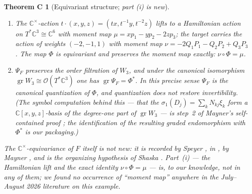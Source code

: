 \documentclass[11pt]{amsart}
\newcommand{\CC}{\mathbb{C}}
\newcommand{\Cstar}{\CC^{\times}}
\newcommand{\W}{W}
\newcommand{\gr}{\operatorname{gr}}
\theoremstyle{plain}
\newtheorem*{thmC}{Theorem C}
\theoremstyle{definition}
\theoremstyle{remark}
\begin{document}
\begin{thmC}[Equivariant structure; \emph{part (i) is new}]
\leavevmode
\begin{enumerate}
\item[(i)] The $\Cstar$-action $t\cdot(x,y,z)=(tx,t^{-1}y,t^{-2}z)$ lifts
to a Hamiltonian action on $T^{*}\CC^{3}\cong\CC^{6}$ with moment map
$\mu=xp_{1}-yp_{2}-2zp_{3}$; the target carries the action of weights
$(-2,-1,1)$ with moment map $\nu=-2Q_{1}P_{1}-Q_{2}P_{2}+Q_{3}P_{3}$. The
map $\Phi$ is equivariant and preserves the moment map exactly:
$\nu\circ\Phi=\mu$.
\item[(ii)] $\Psi_{F}$ preserves the order filtration of $\W_{3}$, and
under the canonical isomorphism $\gr\W_{3}\cong\mathcal{O}(T^{*}\CC^{3})$
one has $\gr\Psi_{F}=\Phi^{*}$. In this precise sense $\Psi_{F}$ is the
canonical quantization of $\Phi$, and quantization does not restore
invertibility. (The symbol computation behind this --- that the
$\sigma_{1}(D_{j})=\sum_{k}N_{kj}\xi_{k}$ form a $\CC[x,y,z]$-basis of the
degree-one part of $\gr\W_{3}$ --- is step~2 of Mayner's self-contained
proof \cite[\S8]{Mayner26}; the identification of the resulting graded
endomorphism with $\Phi^{*}$ is our packaging.)
\end{enumerate}
The $\Cstar$-equivariance of $F$ itself is not new: it is recorded by
Speyer \cite{Speyer26}, in \cite{MO513387}, by Mayner
\cite[\S6]{Mayner26}, and is the organizing hypothesis of Shaska
\cite{Shaska26}. Part~(i) --- the Hamiltonian lift and the exact identity
$\nu\circ\Phi=\mu$ --- is, to our knowledge, not in any of them; we found
no occurrence of ``moment map'' anywhere in the July--August 2026
literature on this example.
\end{thmC}
\end{document}
